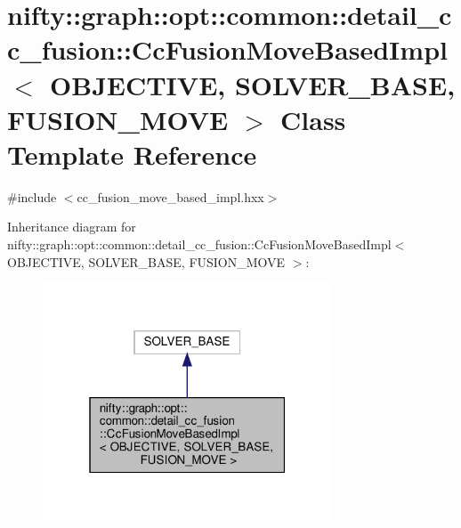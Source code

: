 \hypertarget{classnifty_1_1graph_1_1opt_1_1common_1_1detail__cc__fusion_1_1CcFusionMoveBasedImpl}{}\section{nifty\+:\+:graph\+:\+:opt\+:\+:common\+:\+:detail\+\_\+cc\+\_\+fusion\+:\+:Cc\+Fusion\+Move\+Based\+Impl$<$ O\+B\+J\+E\+C\+T\+I\+VE, S\+O\+L\+V\+E\+R\+\_\+\+B\+A\+SE, F\+U\+S\+I\+O\+N\+\_\+\+M\+O\+VE $>$ Class Template Reference}
\label{classnifty_1_1graph_1_1opt_1_1common_1_1detail__cc__fusion_1_1CcFusionMoveBasedImpl}


{\ttfamily \#include $<$cc\+\_\+fusion\+\_\+move\+\_\+based\+\_\+impl.\+hxx$>$}



Inheritance diagram for nifty\+:\+:graph\+:\+:opt\+:\+:common\+:\+:detail\+\_\+cc\+\_\+fusion\+:\+:Cc\+Fusion\+Move\+Based\+Impl$<$ O\+B\+J\+E\+C\+T\+I\+VE, S\+O\+L\+V\+E\+R\+\_\+\+B\+A\+SE, F\+U\+S\+I\+O\+N\+\_\+\+M\+O\+VE $>$\+:
\nopagebreak
\begin{figure}[H]
\begin{center}
\leavevmode
\includegraphics[width=244pt]{classnifty_1_1graph_1_1opt_1_1common_1_1detail__cc__fusion_1_1CcFusionMoveBasedImpl__inherit__graph}
\end{center}
\end{figure}


